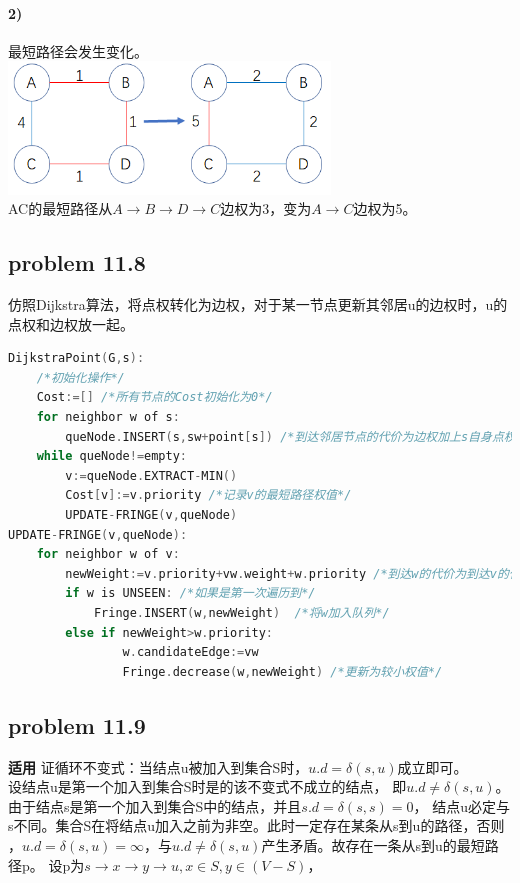 \documentclass[11pt,a4paper,oneside,oldfontcommands]{ctexart}
\begin{document}
\paragraph*{2)}最短路径会发生变化。\\
\includegraphics[height=100pt]{11-6.png}\\
AC的最短路径从$A\rightarrow B\rightarrow D\rightarrow C$边权为3，变为$A\rightarrow C$边权为5。
{\subsection*{problem 11.8}}
仿照Dijkstra算法，将点权转化为边权，对于某一节点更新其邻居u的边权时，u的点权和边权放一起。
\begin{lstlisting}[language=C++,title=DijkstraPoint.func]
DijkstraPoint(G,s):
	/*初始化操作*/
	Cost:=[] /*所有节点的Cost初始化为0*/
	for neighbor w of s:
		queNode.INSERT(s,sw+point[s]) /*到达邻居节点的代价为边权加上s自身点权*/
	while queNode!=empty:
		v:=queNode.EXTRACT-MIN()
		Cost[v]:=v.priority /*记录v的最短路径权值*/
		UPDATE-FRINGE(v,queNode)
UPDATE-FRINGE(v,queNode):
	for neighbor w of v:
		newWeight:=v.priority+vw.weight+w.priority /*到达w的代价为到达v的代价加上vw边权和w点权*/
		if w is UNSEEN: /*如果是第一次遍历到*/
			Fringe.INSERT(w,newWeight)  /*将w加入队列*/
		else if newWeight>w.priority:
				w.candidateEdge:=vw
				Fringe.decrease(w,newWeight) /*更新为较小权值*/
\end{lstlisting}
{\subsection*{problem 11.9}}
\noindent \textbf{适用 }
证循环不变式：当结点u被加入到集合S时，$u.d=\delta(s,u)$成立即可。\\

设结点u是第一个加入到集合S时是的该不变式不成立的结点，
即$u.d\neq\delta(s,u)$。由于结点s是第一个加入到集合S中的结点，并且$s.d=\delta(s,s)=0$，
结点u必定与s不同。集合S在将结点u加入之前为非空。此时一定存在某条从s到u的路径，否则
，$u.d=\delta(s,u)=\infty$，与$u.d\neq\delta(s,u)$产生矛盾。故存在一条从s到u的最短路径p。
设p为$s\rightarrow x\rightarrow y\rightarrow u,x\in S,y\in(V-S)$，\\
\end{document}
